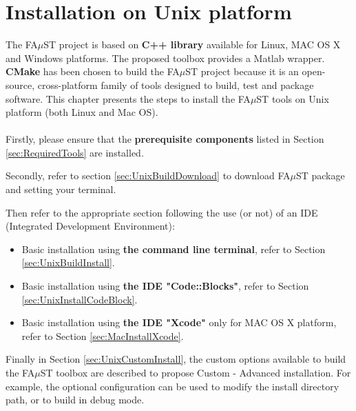 \chapter{Installation on Unix platform}\label{sec:InstallUnix}

The FA$\mu$ST project is based on \textbf{C++ library} available for Linux, MAC OS X and Windows platforms. The proposed toolbox provides a Matlab wrapper. \textbf{CMake} has been chosen to build the FA$\mu$ST project because it is an open-source, cross-platform family of tools designed to build, test and package software. This chapter presents the steps to install the FA$\mu$ST tools on Unix platform (both Linux and Mac OS).\\
\\
Firstly, please ensure that the \textbf{prerequisite components} listed in Section \ref{sec:RequiredTools} are installed.

Secondly, refer to section \ref{sec:UnixBuildDownload} to download FA$\mu$ST package and setting your terminal. 

Then refer to the appropriate section following the use (or not) of an IDE (Integrated Development Environment): 
\begin{itemize}
\item Basic installation using \textbf{the command line terminal}, refer to Section \ref{sec:UnixBuildInstall}.
\item Basic installation using \textbf{the IDE "Code::Blocks"}, refer to Section \ref{sec:UnixInstallCodeBlock}. 
\item Basic installation using \textbf{the IDE "Xcode"} only for MAC OS X platform, refer to Section \ref{sec:MacInstallXcode}. 
\end{itemize}

Finally in Section \ref{sec:UnixCustomInstall}, the custom options available to build the FA$\mu$ST toolbox are described to propose Custom - Advanced installation. For example, the optional configuration can be used to modify the install directory path, or to build in debug mode.  

